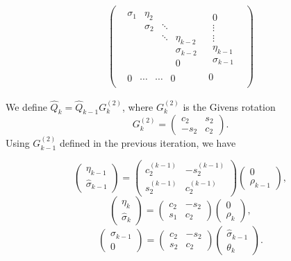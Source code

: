 \documentclass[11pt]{article}
\newcommand{\hQ}{\hat{Q}}
\begin{document}
\begin{eqnarray*}
\begin{pmatrix}\begin{array}{c|c}
\begin{matrix}
 \sigma_1    & \eta_2 &         &      \\
            & \sigma_2   & \ddots  &      \\
            &          & \ddots  & \eta_{k-2}     \\
            &          &         & \sigma_{k-2} \\
		        &          &         & 0 
 \end{matrix}
&  \begin{matrix} 0 \\ \vdots \\ \vdots \\ \eta_{k-1} \\ \sigma_{k-1} \end{matrix} \\
\hline
\begin{matrix} 0 & \cdots  & \cdots & 0  \end{matrix} & 0
\end{array}\end{pmatrix}
\end{eqnarray*}

We define $\hQ_k = \hQ_{k-1}G^{(2)}_k$, where $G^{(2)}_k$ is the Givens rotation
$$G^{(2)}_k = \begin{pmatrix}
c_2 & s_2 \\
-s_2 & c_2
\end{pmatrix}. $$
Using $G^{(2)}_{k-1}$ defined in the previous iteration, we have

\[ \begin{pmatrix} \eta_{k-1} \\ \hat{\sigma}_{k-1} \end{pmatrix}
= \begin{pmatrix}  c^{(k-1)}_2 & -s^{(k-1)}_2 \\
 s^{(k-1)}_2 & c^{(k-1)}_2 \end{pmatrix}
\begin{pmatrix} 0 \\ \rho_{k-1} \end{pmatrix},
\]
\[ \begin{pmatrix} \eta_{k} \\ \hat{\sigma}_{k} \end{pmatrix}
= \begin{pmatrix}  c_2 & -s_2 \\ s_1 & c_2 \end{pmatrix}
\begin{pmatrix} 0 \\ \rho_{k} \end{pmatrix},
\]
\[ \begin{pmatrix} \sigma_{k-1} \\ 0 \end{pmatrix}
= \begin{pmatrix}  c_2 & -s_2 \\ s_2 & c_2 \end{pmatrix}
\begin{pmatrix} \hat{\sigma}_{k-1} \\ \theta_k \end{pmatrix}.
\]
\end{document}

